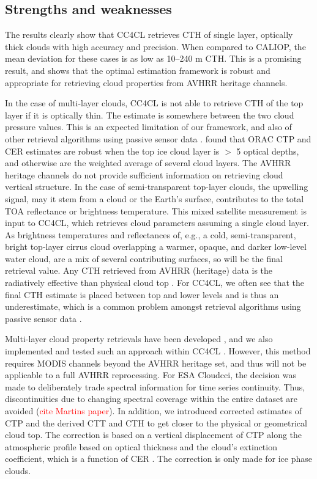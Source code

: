 \subsection{Strengths and weaknesses}

The results clearly show that CC4CL retrieves CTH of single layer, optically thick clouds with high accuracy and precision. When compared to CALIOP, the mean deviation for these cases is as low as 10--240 m CTH. This is a promising result, and shows that the optimal estimation framework is robust and appropriate for retrieving cloud properties from AVHRR heritage channels. 

In the case of multi-layer clouds, CC4CL is not able to retrieve CTH of the top layer if it is optically thin. The estimate is somewhere between the two cloud pressure values. This is an expected limitation of our framework, and also of other retrieval algorithms using passive sensor data \citep{Holz08,Karlsson10}. \citet{Poulsen12} found that ORAC CTP and CER estimates are robust when the top ice cloud layer is $>$ 5 optical depths, and otherwise are the weighted average of several cloud layers. The AVHRR heritage channels do not provide sufficient information on retrieving cloud vertical structure. In the case of semi-transparent top-layer clouds, the upwelling signal, may it stem from a cloud or the Earth's surface, contributes to the total TOA reflectance or brightness temperature. This mixed satellite measurement is input to CC4CL, which retrieves cloud parameters assuming a single cloud layer. As brightness temperatures and reflectances of, e.g., a cold, semi-transparent, bright top-layer cirrus cloud overlapping a warmer, opaque, and darker low-level water cloud, are a mix of several contributing surfaces, so will be the final retrieval value. Any CTH retrieved from AVHRR (heritage) data is the radiatively effective than physical cloud top \citep{Karlsson13}. For CC4CL, we often see that the final CTH estimate is placed between top and lower levels and is thus an underestimate, which is a common problem amongst retrieval algorithms using passive sensor data \citep{Watts11,Holz08,Karlsson13}. 

Multi-layer cloud property retrievals have been developed \citep{Watts11}, and we also implemented and tested such an approach within CC4CL \citep{GregMulti17}. However, this method requires MODIS channels beyond the AVHRR heritage set, and thus will not be applicable to a full AVHRR reprocessing. For ESA Cloud\textunderscore cci, the decision was made to deliberately trade spectral information for time series continuity. Thus, discontinuities due to changing spectral coverage within the entire dataset are avoided (\textcolor{red}{cite Martins paper}). In addition, we introduced corrected estimates of CTP and the derived CTT and CTH to get closer to the physical or geometrical cloud top. The correction is based on a vertical displacement of CTP along the atmospheric profile based on optical thickness and the cloud's extinction coefficient, which is a function of CER \citep{GregConsistency17}. The correction is only made for ice phase clouds.

